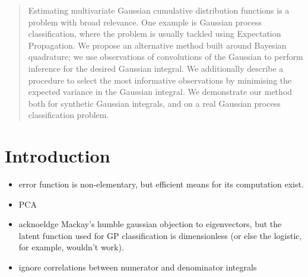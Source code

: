 \documentclass[twoside]{article}
\begin{document}

\begin{abstract}%
Estimating multivariate Gaussian cumulative distribution functions is a problem with broad relevance. One example is Gaussian process classification, where the problem is usually tackled using Expectation Propagation. We propose an alternative method built around Bayesian quadrature; we use observations of convolutions of the Gaussian to perform inference for the desired Gaussian integral. We additionally describe a procedure to select the most informative observations by minimising the expected variance in the Gaussian integral. We demonstrate our method both for synthetic Gaussian integrals, and on a real Gaussian process classification problem. 
\end{abstract}


\section{Introduction}

\begin{itemize}
 \item error function is non-elementary, but efficient means for its computation exist. 
 \item PCA
 \item acknoeldge Mackay's humble gaussian objection to eigenvectors, but the latent function used for GP classification is dimensionless (or else the logistic, for example, wouldn't work).
\item ignore correlations between numerator and denominator integrals
\end{itemize}
\end{document}
